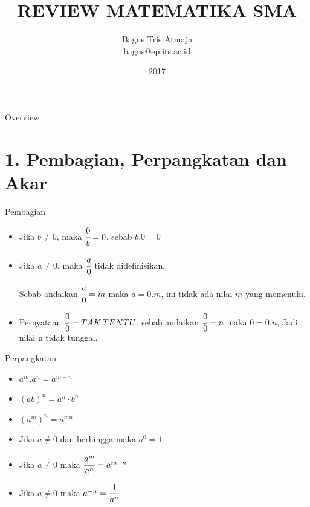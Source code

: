 \documentclass{beamer}
\author{Bagus Tris Atmaja\\bagus@ep.its.ac.id}
\title{REVIEW MATEMATIKA SMA}
\institute{Institut Teknologi Sepuluh Nopember}
\date{2017}
\begin{document}
\begin{frame}[t,plain]
\titlepage
\end{frame}

\begin{frame}[t,fragile]{Overview}
\tableofcontents
\end{frame}

\section{1. Pembagian, Perpangkatan dan Akar}
\begin{frame}[t]{Pembagian}
\begin{center}
\end{center}
\begin{itemize}
    \item Jika $b \neq 0$, maka $\cfrac{0} {b} = 0$, sebab $b.0 = 0$
    \item Jika $a \neq 0$, maka $\cfrac{a} {0}$ tidak didefinisikan. 

    Sebab andaikan $\cfrac{a}{0} = m$ maka $ a = 0.m$, ini tidak ada nilai $m$ yang memenuhi.
    \item Pernyataan $\cfrac{0}{0}=TAK \, TENTU$, sebab andaikan $\cfrac{0}{0} = n$ maka $0=0.n$, Jadi nilai n tidak tunggal.
\end{itemize}
\end{frame}

\begin{frame}[t]{Perpangkatan}
        \begin{itemize}
        \item $ a^{m} . a^{n} =a^{m+n} $ \\
        \item $ (ab)^{n} = a^{n} \cdot b^{n} $ \\
        \item $ (a^{m})^{n} = a^{mn}$
        \item Jika $a \neq 0$ dan berhingga maka $a^{0}=1$
        \item Jika $a \neq 0$ maka $\cfrac{a^m}{a^n}=a^{m-n}$
        \item Jika $a \neq 0$ maka $ a^{-n}=\cfrac{1}{a^{n}}$
        \end{itemize}
\end{frame}
\end{document}
